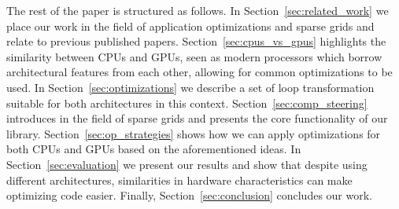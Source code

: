 The rest of the paper is structured as follows. In
Section~\ref{sec:related_work} we place our work in the field of application
optimizations and sparse grids and relate to previous published papers.
Section~\ref{sec:cpus_vs_gpus} highlights the similarity between CPUs and GPUs,
seen as modern processors which borrow architectural features from each other,
allowing for common optimizations to be used.
In Section~\ref{sec:optimizations} we describe a set of loop transformation
suitable for both architectures in this context. Section~\ref{sec:comp_steering}
introduces in the field of sparse grids and presents the core functionality of
our library. Section~\ref{sec:op_strategies} shows how we can apply
optimizations for both CPUs and GPUs based on the aforementioned ideas. In
Section~\ref{sec:evaluation} we present our results and show that despite using
different architectures, similarities in hardware characteristics can make
optimizing code easier. Finally, Section~\ref{sec:conclusion} concludes our
work.
